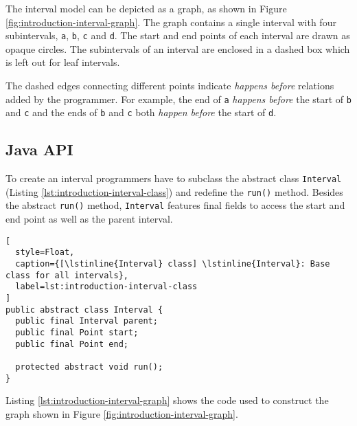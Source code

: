 The interval model can be depicted as a graph, as shown in Figure
\ref{fig:introduction-interval-graph}. The graph contains a single
interval with four subintervals, \lstinline!a!, \lstinline!b!,
\lstinline!c! and \lstinline!d!. The start and end points of each
interval are drawn as opaque circles. The subintervals of an interval
are enclosed in a dashed box which is left out for leaf intervals.

The dashed edges connecting different points indicate \emph{happens
  before} relations added by the programmer. For example, the end of
\lstinline!a! \emph{happens before} the start of \lstinline!b! and
\lstinline!c! and the ends of \lstinline!b! and \lstinline!c! both
\emph{happen before} the start of \lstinline!d!.

\subsection{Java API}
\label{sec:intro-intervals-java-api}

To create an interval programmers have to subclass the abstract class
\lstinline!Interval! (Listing \ref{lst:introduction-interval-class})
and redefine the \lstinline!run()! method. Besides the abstract
\lstinline!run()! method, \lstinline!Interval! features final fields
to access the start and end point as well as the parent interval.

\begin{lstlisting}[
  style=Float, 
  caption={[\lstinline{Interval} class] \lstinline{Interval}: Base class for all intervals},
  label=lst:introduction-interval-class
]
public abstract class Interval {
  public final Interval parent;
  public final Point start;
  public final Point end;

  protected abstract void run();
}
\end{lstlisting}

Listing \ref{lst:introduction-interval-graph} shows the code used to
construct the graph shown in Figure
\ref{fig:introduction-interval-graph}.

